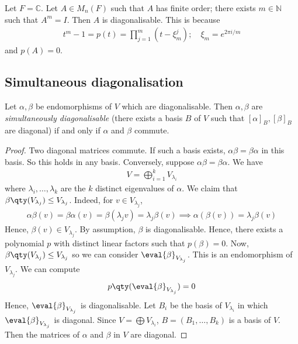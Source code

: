 \begin{example}
	Let $F = \mathbb C$.
	Let $A \in M_n(F)$ such that $A$ has finite order; there exists $m \in \mathbb N$ such that $A^m = I$.
	Then $A$ is diagonalisable.
	This is because
	\begin{align*}
		t^m - 1 = p(t) = \prod_{j=1}^m (t - \xi_m^j);\quad \xi_m = e^{2 \pi i/m}
	\end{align*}
	and $p(A) = 0$.
\end{example}

\subsection{Simultaneous diagonalisation}
\begin{theorem}
	Let $\alpha, \beta$ be endomorphisms of $V$ which are diagonalisable.
	Then $\alpha, \beta$ are \textit{simultaneously diagonalisable} (there exists a basis $B$ of $V$ such that $[\alpha]_B, [\beta]_B$ are diagonal) if and only if $\alpha$ and $\beta$ commute.
\end{theorem}
\begin{proof}
	Two diagonal matrices commute.
	If such a basis exists, $\alpha \beta = \beta \alpha$ in this basis.
	So this holds in any basis.
	Conversely, suppose $\alpha \beta = \beta \alpha$.
	We have
	\begin{align*}
		V = \bigoplus_{i=1}^k V_{\lambda_i}
	\end{align*}
	where $\lambda_i, \dots, \lambda_k$ are the $k$ distinct eigenvalues of $\alpha$.
	We claim that $\beta \qty(V_{\lambda_j}) \leq V_{\lambda_j}$.
	Indeed, for $v \in V_{\lambda_j}$,
	\begin{align*}
		\alpha \beta(v) = \beta \alpha(v) = \beta(\lambda_j v) = \lambda_j \beta(v) \implies \alpha(\beta(v)) = \lambda_j \beta(v)
	\end{align*}
	Hence, $\beta(v) \in V_{\lambda_j}$.
	By assumption, $\beta$ is diagonalisable.
	Hence, there exists a polynomial $p$ with distinct linear factors such that $p(\beta) = 0$.
	Now, $\beta\qty(V_{\lambda_j}) \leq V_{\lambda_j}$ so we can consider $\eval{\beta}_{V_{\lambda_j}}$.
	This is an endomorphism of $V_{\lambda_j}$.
	We can compute
	\begin{align*}
		p\qty(\eval{\beta}_{V_{\lambda_j}}) = 0
	\end{align*}
	Hence, $\eval{\beta}_{V_{\lambda_j}}$ is diagonalisable.
	Let $B_i$ be the basis of $V_{\lambda_i}$ in which $\eval{\beta}_{V_{\lambda_j}}$ is diagonal.
	Since $V = \bigoplus V_{\lambda_i}$, $B = (B_1, \dots, B_k)$ is a basis of $V$.
	Then the matrices of $\alpha$ and $\beta$ in $V$ are diagonal.
\end{proof}

